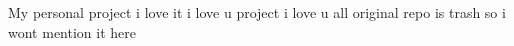 My personal project i love it i love u project i love u all original repo is trash so i wont mention it here 